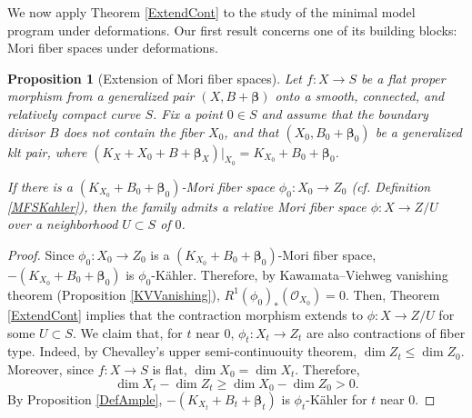 \documentclass[12pt]{amsart}
\numberwithin{equation}{section}
\newtheorem{theorem} {Theorem} [section]
\newtheorem{proposition}[theorem]{Proposition}
\theoremstyle{definition}
\theoremstyle{plain}
\newtheorem*{thm A*}{Theorem A}
\newtheorem*{thm B*}{Theorem B}
\newtheorem*{thm C*}{Theorem C}
\newtheorem*{thm D*}{Theorem D}
\theoremstyle{definition}
\newtheorem{remark}  [theorem]     {Remark}
\renewcommand{\1}{\mathds{1}}
\newcommand{\bbeta}{\boldsymbol{\beta}}
\renewcommand{\>}{\rightarrow}
\begin{document}


We now apply Theorem \ref{ExtendCont} to the study of the minimal model program under deformations. Our first result concerns one of its building blocks: Mori fiber spaces under deformations.

\begin{proposition}[Extension of Mori fiber spaces]\label{extFano}
Let $f:X\to S$ be a flat proper morphism from a generalized pair $(X,B+ { \boldsymbol{\beta}})$  onto a smooth, connected, and relatively compact curve $S$. Fix a point $0\in S$ and assume that the boundary divisor $B$ does not contain the fiber $X_0$, and that $(X_0,B_0 + { \boldsymbol{\beta}}_0)$ be a generalized klt pair, where $(K_X+X_0+B+\bbeta _X)|_{X_0}=K_{X_0}+B_0+\bbeta _0$. 

If there is a $(K_{X_0}+B_0+ \bbeta_0)$-Mori fiber space $\phi_0:X_0 \to Z_0$ (cf. Definition \ref{MFSKahler}), then the family admits a relative Mori fiber space $\phi: X\to Z /U$ over a neighborhood $U \subset S$ of $0$.
\end{proposition}

\begin{proof}
Since $\phi_0 : X_0\to Z_0$ is a $(K_{X_0} +B_0+ \bbeta_0)$-Mori fiber space, $-(K_{X_0}+ B_0 + { {\bbeta}}_0)$ is $\phi_0$-K\"ahler. 
Therefore, by Kawamata--Viehweg vanishing theorem (Proposition \ref{KVVanishing}), $R^1(\phi_0)_*(\mathcal{O}_{X_0}) = 0$. 
Then, Theorem \ref{ExtendCont} implies that the contraction morphism extends to $\phi:X\to Z/U$ for some $U \subset S$. 
We claim that,  for $t$ near 0, $\phi_t:X_t \to Z_t$ are also  contractions of fiber type. Indeed, by Chevalley's upper semi-continuouity theorem,  $\dim Z_t \le \dim Z_0$. 
Moreover, since $f:X\to S$ is flat, $\dim X_0 = \dim X_t$. Therefore, $$ \dim X_t  - \dim Z_t \ge \dim X_0 - \dim Z_0 >0.$$
By Proposition \ref{DefAmple}, $-(K_{X_t}+B_t +  { {\bbeta}}_t )$ is $\phi_t$-K\"ahler for $t$ near $0$. 
\end{proof}
\end{document}
